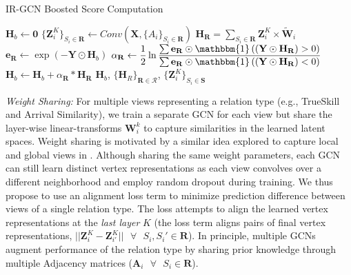 \begin{algorithm}[tbh]
\caption{IR-GCN Boosted Score Computation}\label{alg:inference}
\begin{algorithmic}[1]
  \State $\mathbf{H}_{b} \gets \mathbf{0} $
    \State $\{ \mathbf{Z}_i^K \}_{S_i \in \mathbf{R}} \gets Conv(\mathbf{X}, \{ A_i \}_{S_i \in \mathbf{R}})$
    \State {}
    \State $\mathbf{H}_\mathbf{R} =\sum_{{S_i} \in \mathbf{R}} \mathbf{Z}_i^{K} \times \widetilde{\mathbf{W}}_i$ 
    \State $ \mathbf{e}_{\mathbf{R}} \gets \exp({-\mathbf{Y} \odot \mathbf{H}_{b}})$
    \State {}
  \State $\alpha_\mathbf{R} \gets \dfrac{1}{2} \ln{\dfrac{\sum \mathbf{e}_{\mathbf{R}} \odot \mathbbm{1}\left((\mathbf{Y} \odot \mathbf{H}_{\mathbf{R}}\right) > 0)}{\sum \mathbf{e}_{\mathbf{R}} \odot \mathbbm{1}\left((\mathbf{Y} \odot \mathbf{H}_{\mathbf{R}}) < 0 \right) }}$
    \State {}
      \State {}
  \State    $\mathbf{H}_{b} \gets \mathbf{H}_{b} + \alpha_\mathbf{R} * \mathbf{H}_{\mathbf{R}}$ 
    \EndFor
    \State \Return $\mathbf{H}_{b}$, $ \{ \mathbf{H}_{R} \}_{\mathbf{R} \in \mathcal{R}}$, $\{ \mathbf{Z}_{i}^{K} \}_{S_i \in \mathbf{S}}$
    \State {}
    \State {}
\EndFunction
\end{algorithmic}
\end{algorithm}

\noindent
\emph{Weight Sharing:} For multiple views representing a relation type (e.g., TrueSkill and Arrival Similarity), we train a separate GCN for each view but share the layer-wise linear-transforms $\mathbf{W}_i^{k}$ to capture similarities in the learned latent spaces.
Weight sharing is motivated by a similar idea explored to capture local and global views in \cite{DualGCN}. Although sharing the same weight parameters, each GCN can still learn distinct vertex representations as each view convolves over a different neighborhood and employ random dropout during training.
We thus propose to use an alignment loss term to minimize prediction difference between views of a single relation type\cite{reg}. The loss attempts to align the learned vertex representations at the \emph{last layer} $K$ (the loss term aligns pairs of final vertex representations, $\lvert\lvert \mathbf{Z}_i^{K} - \mathbf{Z}_{i'}^{K} \lvert\lvert \texttt{  }\forall\texttt{ } S_i, S_i' \in \mathbf{R}$). In principle, multiple GCNs augment performance of the relation type by sharing prior knowledge through multiple Adjacency matrices ($\mathbf{A}_i \texttt{  }\forall\texttt{ } S_i \in \mathbf{R}$).

